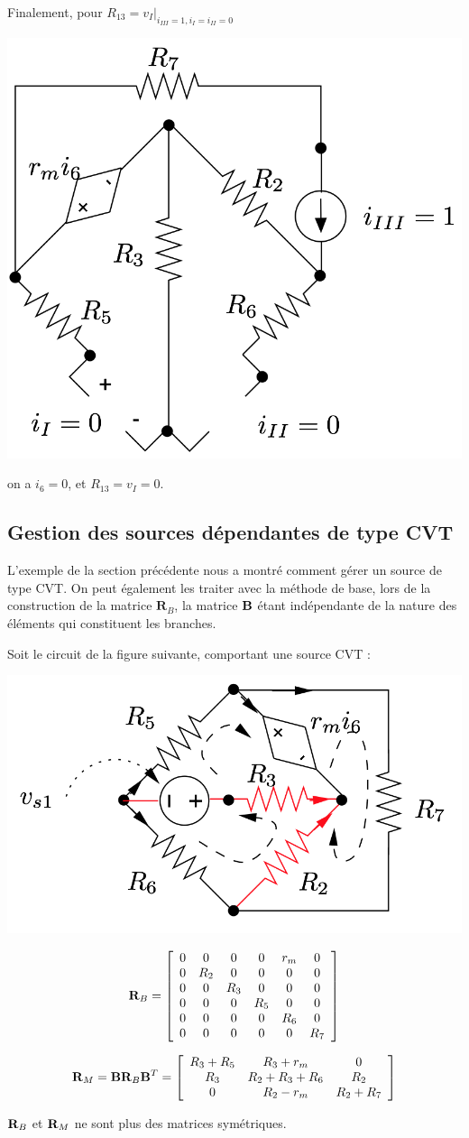 \begin{testexample}
	Finalement, pour $R_{13}=v_{I}|_{i_{III}=1,i_{I}=i_{II}=0}$
	\begin{center}
		\includegraphics[width=0.4\linewidth]{figs/methodes-generales/ex_exp_MM_3}
	\end{center}
	on a $i_6=0$, et $R_{13} = v_{I}= 0$.
\end{testexample}


\subsection{Gestion des sources dépendantes de type CVT}
L'exemple de la section précédente nous a montré comment gérer un source de type CVT. On peut également les traiter avec la méthode de base, lors de la construction de la matrice $\mathbf{R}_B$, la matrice ${\bf B}$ étant indépendante de la nature des éléments qui constituent les branches. 

\begin{testexample}
	Soit le circuit de la figure suivante, comportant une source CVT :
	\begin{center}
		\includegraphics[width=0.5\linewidth]{figs/methodes-generales/ex_exp_MM_0}
	\end{center}
	\[{\bf R}_B=
	\left[
	\begin{array}{cccccc}
	0 & 0 & 0 & 0 & r_m & 0\\
	0 & R_2 & 0 & 0 & 0 & 0 \\
	0 & 0 & R_3 & 0 & 0 & 0\\
	0 & 0 & 0 & R_5 & 0 & 0\\
	0 & 0 & 0 & 0 & R_6 & 0\\
	0 & 0 & 0 & 0 & 0 & R_7
	\end{array}\right]\]
	
	\[{\bf R}_M={\bf B}{\bf R}_B{\bf B}^T= 
	\left[
	\begin{array}{ccc}
	R_3+R_5 & R_3+r_m & 0 \\
	R_3 & R_2+R_3+R_6 & R_2 \\
	0 & R_2-r_m & R_2+R_7
	\end{array}\right]\]
	
	${\bf R}_B$ et  ${\bf R}_M$ ne sont plus des matrices symétriques.
\end{testexample}

